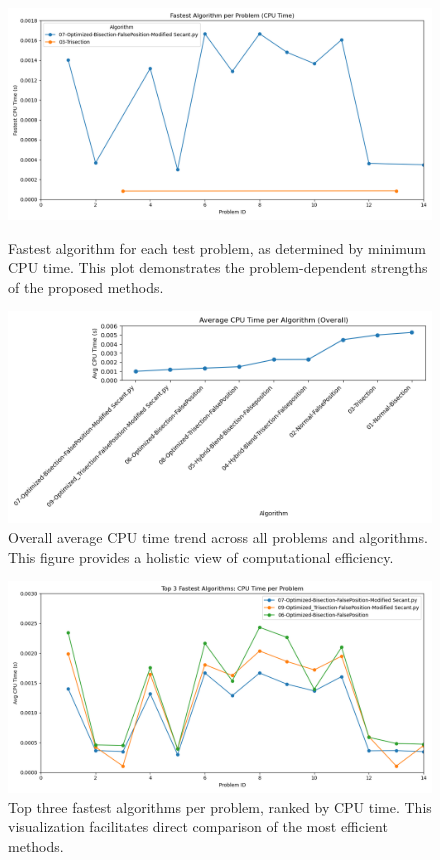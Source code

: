 \documentclass[amsmath, amssymb, aps]{revtex4-2}
\begin{document}
\begin{figure}[H]
    \centering
    \begin{minipage}{\linewidth}
        \centering
        \includegraphics[width=0.8\linewidth]{fastest_algorithm_per_problem_lineplot.png}
        \caption{Fastest algorithm for each test problem, as determined by minimum CPU time. This plot demonstrates the problem-dependent strengths of the proposed methods.}
        \label{fig:fastest_algorithm}
    \end{minipage}
    \vspace{-15pt} 
    \begin{minipage}{\linewidth}
        \centering
        \includegraphics[width=0.8\linewidth]{avg_cpu_time_lineplot_overall.png}
        \caption{Overall average CPU time trend across all problems and algorithms. This figure provides a holistic view of computational efficiency.}
        \label{fig:avg_cpu_time_overall}
    \end{minipage}
\end{figure}

\begin{figure}[H]
    \centering
    \includegraphics[width=0.8\linewidth]{top3_fastest_algorithms_lineplot.png}
    \caption{Top three fastest algorithms per problem, ranked by CPU time. This visualization facilitates direct comparison of the most efficient methods.}
    \label{fig:top3_fastest}
\end{figure}
\end{document}
